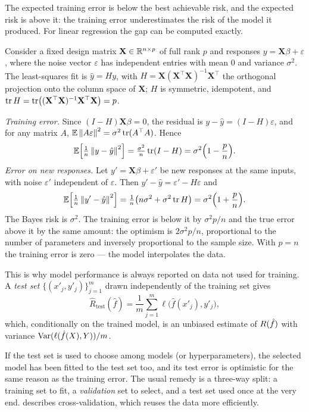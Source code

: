 \begin{notechapter}
The expected training error is below the best achievable risk, and the
expected risk is above it: the training error underestimates the risk of the
model it produced. For linear regression the gap can be computed exactly.

\begin{example}\label{erm:ex:ols-optimism}
Consider a fixed design matrix $\mathbf X \in \mathbb{R}^{n\times p}$ of full rank
$p$ and responses $y = \mathbf X\beta + \varepsilon$, where the noise vector
$\varepsilon$ has independent entries with mean $0$ and variance $\sigma^2$. The
least-squares fit is $\hat y = H y$, with $H = \mathbf X(\mathbf X^\top\mathbf X)^{-1}\mathbf X^\top$
the orthogonal projection onto the column space of $\mathbf X$; $H$ is
symmetric, idempotent, and $\operatorname{tr} H = \operatorname{tr}\bigl((\mathbf X^\top\mathbf X)^{-1}\mathbf X^\top\mathbf X\bigr) = p$.

\emph{Training error.} Since $(I - H)\mathbf X\beta = 0$, the residual is
$y - \hat y = (I-H)\varepsilon$, and for any matrix $A$,
$\mathbb{E}\left\|A\varepsilon\right\|^2 = \sigma^2 \operatorname{tr}(A^\top A)$. Hence
\[
  \mathbb{E}\Bigl[\tfrac1n\left\|y - \hat y\right\|^2\Bigr] = \tfrac{\sigma^2}{n}\operatorname{tr}(I-H) = \sigma^2\Bigl(1 - \frac pn\Bigr).
\]
\emph{Error on new responses.} Let $y' = \mathbf X\beta + \varepsilon'$ be new
responses at the same inputs, with noise $\varepsilon'$ independent of
$\varepsilon$. Then $y' - \hat y = \varepsilon' - H\varepsilon$ and
\[
  \mathbb{E}\Bigl[\tfrac1n\left\|y' - \hat y\right\|^2\Bigr] = \tfrac{1}{n}\bigl(n\sigma^2 + \sigma^2 \operatorname{tr} H\bigr) = \sigma^2\Bigl(1 + \frac pn\Bigr).
\]
The Bayes risk is $\sigma^2$. The training error is below it by
$\sigma^2 p/n$ and the true error above it by the same amount: the optimism is
$2\sigma^2 p/n$, proportional to the number of parameters and inversely
proportional to the sample size. With $p = n$ the training error is zero ---
the model interpolates the data.
\end{example}

This is why model performance is always reported on data not used for
training. A \emph{test set} $\{(x'_j,y'_j)\}_{j=1}^m$ drawn independently of
the training set gives
\[
  \widehat R_{\mathrm{test}}(\hat f) = \frac1m\sum_{j=1}^m \ell\bigl(\hat f(x'_j), y'_j\bigr),
\]
which, conditionally on the trained model, is an unbiased estimate of
$R(\hat f)$ with variance $\operatorname{Var}(\ell(\hat f(X),Y))/m$.

\begin{pitfall}
If the test set is used to choose among models (or hyperparameters), the
selected model has been fitted to the test set too, and its test error is
optimistic for the same reason as the training error. The usual remedy is a
three-way split: a training set to fit, a \emph{validation} set to select, and
a test set used once at the very end.  describes
cross-validation, which reuses the data more efficiently.
\end{pitfall}


\end{notechapter}
